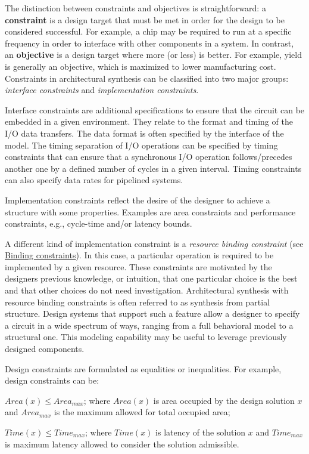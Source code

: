 The distinction between constraints and objectives is straightforward\+: a {\bfseries constraint} is a design target that must be met in order for the design to be considered successful. For example, a chip may be required to run at a specific frequency in order to interface with other components in a system. In contrast, an {\bfseries objective} is a design target where more (or less) is better. For example, yield is generally an objective, which is maximized to lower manufacturing cost. Constraints in architectural synthesis can be classified into two major groups\+: {\itshape interface constraints} and {\itshape implementation constraints}.

Interface constraints are additional specifications to ensure that the circuit can be embedded in a given environment. They relate to the format and timing of the I/O data transfers. The data format is often specified by the interface of the model. The timing separation of I/O operations can be specified by timing constraints that can ensure that a synchronous I/O operation follows/precedes another one by a defined number of cycles in a given interval. Timing constraints can also specify data rates for pipelined systems.

Implementation constraints reflect the desire of the designer to achieve a structure with some properties. Examples are area constraints and performance constraints, e.\+g., cycle-\/time and/or latency bounds.

A different kind of implementation constraint is a {\itshape resource binding constraint} (see \hyperlink{src_HLS_binding_constraints_page}{Binding constraints}). In this case, a particular operation is required to be implemented by a given resource. These constraints are motivated by the designer\textquotesingle{}s previous knowledge, or intuition, that one particular choice is the best and that other choices do not need investigation. Architectural synthesis with resource binding constraints is often referred to as synthesis from partial structure. Design systems that support such a feature allow a designer to specify a circuit in a wide spectrum of ways, ranging from a full behavioral model to a structural one. This modeling capability may be useful to leverage previously designed components.

Design constraints are formulated as equalities or inequalities. For example, design constraints can be\+:
\begin{DoxyItemize}
\item $Area(x) \leq Area_{max}$; where $Area(x)$ is area occupied by the design solution $x$ and $Area_{max}$ is the maximum allowed for total occupied area;
\item $Time(x) \leq Time_{max}$; where $Time(x)$ is latency of the solution $x$ and $Time_{max}$ is maximum latency allowed to consider the solution admissible.
\end{DoxyItemize}

